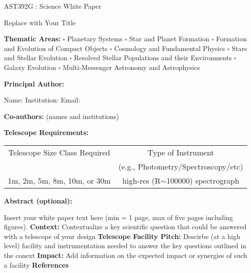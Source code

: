 \documentclass[12pt]{article}
\begin{document}
\raggedright
\huge
AST392G : Science White Paper \linebreak

Replace with Your Title \linebreak
\normalsize

\noindent \textbf{Thematic Areas:} \hspace*{60pt} $\square$ Planetary Systems \hspace*{10pt} $\square$ Star and Planet Formation \hspace*{20pt}\linebreak
$\square$ Formation and Evolution of Compact Objects \hspace*{31pt} $\square$ Cosmology and Fundamental Physics \linebreak
  $\square$  Stars and Stellar Evolution \hspace*{1pt} $\square$ Resolved Stellar Populations and their Environments \hspace*{40pt} \linebreak
  $\square$    Galaxy Evolution   \hspace*{45pt} $\square$             Multi-Messenger Astronomy and Astrophysics \hspace*{65pt} \linebreak
  
\textbf{Principal Author:}

Name:	
 \linebreak						
Institution:  
 \linebreak
Email: 
 \linebreak
 
\textbf{Co-authors:} (names and institutions)
  \linebreak

\textbf{Telescope Requirements:} 
\begin{center}
\begin{tabular}{||c | c ||} 
 \hline
 Telescope Size Class Required  & Type of Instrument\\ 
 & (e.g., Photometry/Spectroscopy/etc)\\ [0.5ex] 
 \hline\hline
 1m, 2m, 5m, 8m, 10m, or 30m  & high-res (R$\sim$100000) spectrograph\\

 \hline
\end{tabular}
\end{center}

\textbf{Abstract  (optional):}


\pagebreak
Insert your white paper text here (min = 1 page, max of five pages including figures).
{\bf Context: } Contextualize a key scientific question that could be answered with a telescope of your design
{\bf Telescope Facility Pitch: } Descirbe (at a high level) facility and instrumentation needed to answer the key questions outlined in the conext 
{\bf Impact:  } Add information on the expected impact or synergies of such a facility
\pagebreak
\textbf{References}
\end{document}
